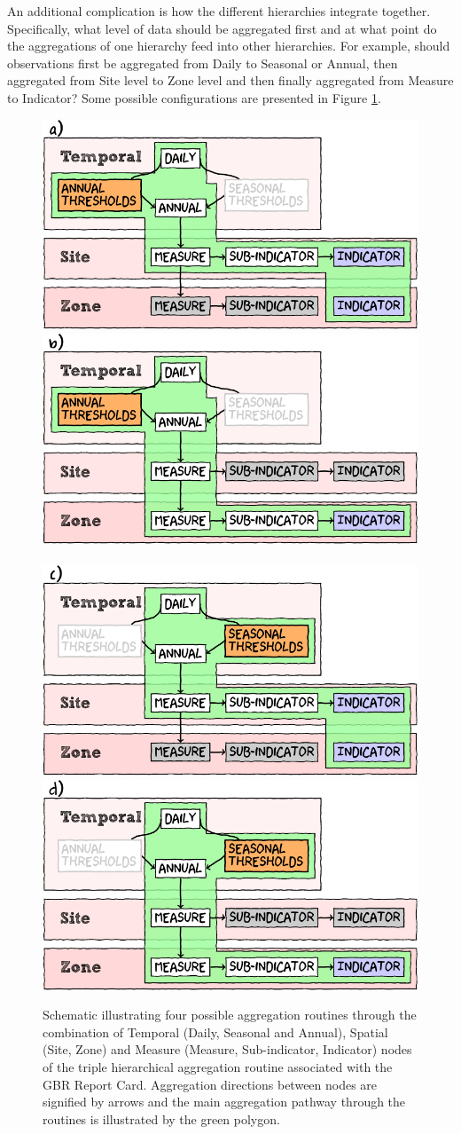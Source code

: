 An additional complication is how the different hierarchies integrate together.  Specifically, what
level of data should be aggregated first and at what point do the aggregations of one hierarchy feed
into other hierarchies. For example, should observations first be aggregated from Daily to Seasonal
or Annual, then aggregated from Site level to Zone level and then finally aggregated from Measure to
Indicator?  Some possible configurations are presented in Figure \ref{fig:hier}.


\begin{landscape}
\begin{figure}[h]
\includegraphics[width=0.49\linewidth]{figures/Diagrams/hier.pdf}
\includegraphics[width=0.49\linewidth]{figures/Diagrams/hier1.pdf}\\\\[1em]
\includegraphics[width=0.49\linewidth]{figures/Diagrams/hier2.pdf}
\includegraphics[width=0.49\linewidth]{figures/Diagrams/hier3.pdf}
\caption[Agregation sequence schematic]{Schematic illustrating four possible aggregation routines through the combination of Temporal (Daily, Seasonal and Annual), Spatial (Site, Zone) and Measure 
(Measure, Sub-indicator, Indicator) nodes of the triple hierarchical
aggregation routine associated with the GBR Report Card. Aggregation directions between 
nodes are signified by arrows and the main aggregation pathway through
the routines is illustrated by the green polygon. }\label{fig:hier}
\end{figure}
\end{landscape}
       



